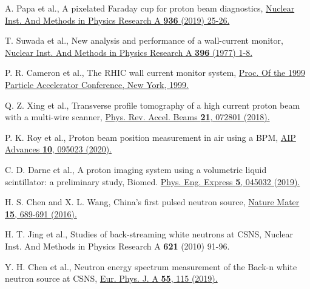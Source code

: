 \documentclass[a4paper,11pt]{article}
\begin{document}
\begin{thebibliography}{90}


 A. Papa et al., A pixelated Faraday cup for proton beam diagnostics, \href{https://www.sciencedirect.com/science/article/pii/S0168900218313275}{\color {blue} Nuclear Inst. And Methods in Physics Research A {\bf 936} (2019) 25-26.}

 T. Suwada et al., New analysis and performance of a wall-current monitor, \href{https://www.sciencedirect.com/science/article/pii/S0168900297007171}{\color {blue} Nuclear Inst. And Methods in Physics Research A {\bf 396} (1977) 1-8.}

 P. R. Cameron et al., The RHIC wall current monitor system, \href{https://accelconf.web.cern.ch/p99/PAPERS/WEA116.PDF}{\color {blue}Proc. Of the 1999 Particle Accelerator Conference, New York, 1999.}




 Q. Z. Xing et al., Transverse profile tomography of a high current proton beam with a multi-wire scanner, \href{https://journals.aps.org/prab/abstract/10.1103/PhysRevAccelBeams.21.072801}{\color {blue}Phys. Rev. Accel. Beams {\bf 21}, 072801 (2018).}


 P. K. Roy et al., Proton beam position measurement in air using a BPM, \href{https://doi.org/10.1063/5.0021497}{\color {blue}AIP Advances {\bf 10}, 095023 (2020).}

 C. D. Darne et al., A proton imaging system using a volumetric liquid scintillator: a preliminary study, Biomed. \href{https://doi.org/10.1088/2057-1976/ab2e4a}{\color {blue}Phys. Eng. Express {\bf 5}, 045032 (2019).}



 H. S. Chen and X. L. Wang, China's first pulsed neutron source, \href{https://doi.org/10.1038/nmat4655}{\color {blue}Nature Mater {\bf 15}, 689-691 (2016).}

 H. T. Jing et al., Studies of back-streaming white neutrons at CSNS, {\color {blue}Nuclear Inst. And Methods in Physics Research A {\bf 621} (2010) 91-96.}

 Y. H. Chen et al., Neutron energy spectrum measurement of the Back-n white neutron source at CSNS, \href{https://doi.org/10.1140/epja/i2019-12808-1}{\color {blue}Eur. Phys. J. A {\bf 55}, 115 (2019).}



\end{thebibliography}
\end{document}
